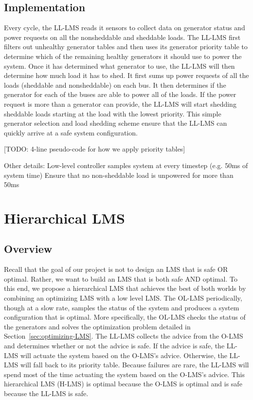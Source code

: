 \documentclass{acm_proc_article-sp}
\begin{document}
\subsection{Implementation}
\label{sec:LL-LMS}
Every cycle, the LL-LMS reads it sensors to collect data on generator status and power requests on all the nonsheddable and sheddable loads. The LL-LMS
first filters out unhealthy generator tables and then uses its generator priority table to determine which of the remaining healthy generators it should
use to power the system. Once it has determined what generator to use, the LL-LMS will then determine how much load it has to shed. It first sums up power
requests of all the loads (sheddable and nonsheddable) on each bus. It then determines if the generator for each of the buses are able to power all of the
loads. If the power request is more than a generator can provide, the LL-LMS will start shedding sheddable loads starting at the load with the lowest
priority. This simple generator selection and load shedding scheme ensure that the LL-LMS can quickly arrive at a safe system configuration.


[TODO: 4-line pseudo-code for how we apply priority tables]

Other details:
Low-level controller samples system at every  timestep (e.g. 50ms of system time) 
Ensure that no non-sheddable load is unpowered for more  than 50ms 

\section{Hierarchical LMS}
\subsection{Overview}
Recall that the goal of our project is not to design an LMS that is safe OR optimal. Rather, we want to build an LMS that is both safe AND optimal. To this
end, we propose a hierarchical LMS that achieves the best of both worlds by combining an optimizing LMS with a low level LMS. The OL-LMS periodically,
though at a slow rate, samples the status of the system and produces a system configuration that is optimal. More specifically, the OL-LMS checks the
status of the generators and solves the optimization problem detailed in Section~\ref{sec:optimizing-LMS}. The LL-LMS collects the advice from the O-LMS
and determines whether or not the advice is safe. If the advice is safe, the LL-LMS will actuate the system based on the O-LMS's advice. Otherwise, the
LL-LMS will fall back to its priority table. Because failures are rare, the LL-LMS will spend most of the time actuating the system based on the O-LMS's
advice. This hierarchical LMS (H-LMS) is optimal because the O-LMS is optimal and is safe because the LL-LMS is safe.
\end{document}
